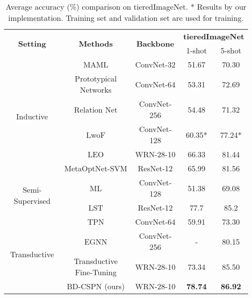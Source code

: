 \documentclass[runningheads]{llncs}
\begin{document}
\begin{table}
\small
\centering
\caption{Average accuracy (\%) comparison on tieredImageNet. * Results by our implementation.  Training set and validation set are used for training.}
\begin{tabular}{ccccc}
\hline
\multirow{2}{*}{\textbf{Setting}} &  \multirow{2}{*}{\textbf{Methods}}  & \multirow{2}{*}{\textbf{Backbone}} & \multicolumn{2}{c}{\textbf{tieredImageNet}} \\ 
\cmidrule(r){4-5}
& & & 1-shot & 5-shot \\ \hline
\multirow{6}{*}{Inductive}  & MAML \cite{finn2017model} & ConvNet-32 & 51.67 & 70.30 \\ 
& Prototypical Networks \cite{snell2017prototypical} & ConvNet-64  & 53.31 & 72.69  \\
& Relation Net \cite{sung2018learning} &  ConvNet-256  & 54.48 & 71.32  \\
& LwoF \cite{gidaris2018dynamic} & ConvNet-128 &  60.35* & 77.24* \\
& LEO \cite{rusu2019meta} & WRN-28-10 & 66.33 & 81.44 \\
& MetaOptNet-SVM \cite{lee2019meta} &  ResNet-12 & 65.99 & 81.56 \\
\hline
\multirow{2}{*}{Semi-Supervised} & ML \cite{ren2018meta} & ConvNet-128 & 51.38 & 69.08 \\
& LST \cite{li2019learning} & ResNet-12 & 77.7 & 85.2 \\
\hline
\multirow{4}{*}{Transductive}  & TPN \cite{liu2019learning} & ConvNet-64 & 59.91 & 73.30 \\
& EGNN \cite{kim2019edge} & ConvNet-256 & - & 80.15 \\
& Transductive Fine-Tuning \cite{dhillon2020a} & WRN-28-10 & 73.34 & 85.50 \\
& BD-CSPN (ours) & WRN-28-10 & \textbf{78.74} & \textbf{86.92} \\
\hline
\end{tabular} 
\label{fsl-result-tieredImagenet}
\end{table}
\end{document}
